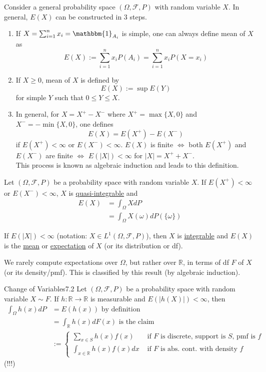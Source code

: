 \documentclass{article}
\newcommand{\R}{\mathbb{R}}
\begin{document}
	Consider a general probability space $(\Omega, \mathcal{F}, P)$ with random variable $X$. In general, $E(X)$ can be constructed in 3 steps.
	
	\begin{enumerate}
		\item If $X=\sum_{i=1}^{n}x_i=\mathbbm{1}_{A_i}$ is simple, one can always define mean of $X$ as $$E(X):=\sum_{i=1}^{n}x_iP(A_i)=\sum_{i=1}^{n}x_iP(X=x_i)$$
		
		\item If $X\geq0$, mean of $X$ is defined by $$E(X):=\sup E(Y)$$ for simple $Y$ such that $0\leq Y\leq X$.
		
		\item In general, for $X=X^+-X^-$ where $X^+=\max\{X, 0\}$ and $X^-=-\min\{X, 0\}$, one defines $$E(X)=E(X^+)-E(X^-)$$ if $E(X^+)<\infty$ or $E(X^-)<\infty$. $E(X)$ is finite $\Leftrightarrow$ both $E(X^+)$ and $E(X^-)$ are finite $\Leftrightarrow$ $E(|X|)<\infty$ for $|X|=X^++X^-$.\\
		
		This process is known as algebraic induction and leads to this definition.
	\end{enumerate}
	
	\begin{mydef}{}{}
		Let $(\Omega, \mathcal{F}, P)$ be a probability space with random variable $X$. If $E(X^+)<\infty$ or $E(X^-)<\infty$, $X$ is \ul{quasi-integrable} and
		\begin{align*}
			E(X)&=\int_{\Omega}XdP\\
			&=\int_{\Omega}X(\omega)dP(\{\omega\})
		\end{align*}
		
		If $E(|X|)<\infty$ (notation: $X\in L^1(\Omega, \mathcal{F}, P)$), then $X$ is \ul{integrable} and $E(X)$ is the \ul{mean} or \ul{expectation} of $X$ (or its distribution or df).
	\end{mydef}
		
		We rarely compute expectations over $\Omega$, but rather over $\R$, in terms of df $F$ of $X$ (or its density/pmf). This is classified by this result (by algebraic induction).
		
		\begin{mythm}{Change of Variables}{7.2}
			Let $(\Omega, \mathcal{F}, P)$ be a probability space with random variable $X\sim F$. If $h : \R\to\R$ is measurable and $E(|h(X)|)<\infty$, then
			\begin{align*}
				\int_{\Omega}h(x)dP&=E(h(x))\mbox{ by definition}\\
				&=\int_{\R}h(x)dF(x)\mbox{ is the claim}\\
				&:=\begin{cases}
					\sum_{x\in S}h(x)f(x)&\mbox{ if $F$ is discrete, support is $S$, pmf is $f$}\\
					\int_{x\in\R}h(x)f(x)dx&\mbox{ if $F$ is abs. cont. with density $f$}
				\end{cases}
			\end{align*}
			(!!!)
		\end{mythm}
		
\end{document}
